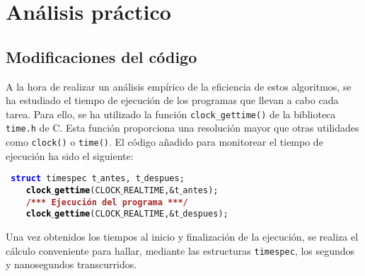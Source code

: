 \documentclass[a4paper, 11pt]{article} %
\begin{document}
\section {Análisis práctico}
\subsection{Modificaciones del código}
A la hora de realizar un análisis empírico de la eficiencia de estos algoritmos, se ha estudiado el tiempo de ejecución de los programas que llevan a cabo cada tarea. Para ello, se ha utilizado la función \texttt{clock\_gettime()} de la biblioteca \texttt{time.h} de C. Esta función proporciona una resolución mayor que otras utilidades como \texttt{clock()} o \texttt{time()}. El código añadido para monitorear el tiempo de ejecución ha sido el siguiente:

\texttt{\mbox{}\ \textbf{\textcolor{Blue}{struct}}\ \textcolor{TealBlue}{timespec}\ t$\_$antes\textcolor{BrickRed}{,}\ t$\_$despues\textcolor{BrickRed}{;} \\
\mbox{}\ \ \ \ \textbf{\textcolor{Black}{clock$\_$gettime}}\textcolor{BrickRed}{(}CLOCK$\_$REALTIME\textcolor{BrickRed}{,\&}t$\_$antes\textcolor{BrickRed}{);} \\
\mbox{}\ \ \ \ \textbf{\textcolor{Brown}{/*** Ejecución del programa ***/}} \\
\mbox{}\ \ \ \ \textbf{\textcolor{Black}{clock$\_$gettime}}\textcolor{BrickRed}{(}CLOCK$\_$REALTIME\textcolor{BrickRed}{,\&}t$\_$despues\textcolor{BrickRed}{);} \\}

Una vez obtenidos los tiempos al inicio y finalización de la ejecución, se realiza el cálculo conveniente para hallar, mediante las estructuras \texttt{timespec}, los segundos y nanosegundos transcurridos.
\end{document}
